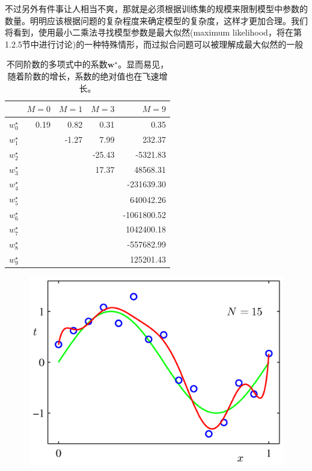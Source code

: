 \documentclass[b5paper]{book}
\numberwithin{equation}{chapter}
\begin{document}
{	\indent 不过另外有件事让人相当不爽，那就是必须根据训练集的规模来限制模型中参数的数量。明明应该根据问题的复杂程度来确定模型的复杂度，这样才更加合理。我们将看到，使用最小二乘法寻找模型参数是最大似然(maximum likelihood，将在第1.2.5节中进行讨论)的一种特殊情形，而过拟合问题可以被理解成最大似然的一般
	\begin{table}
		\centering
		\begin{tabular}{c|rrrr}
			\ & $M=0$ & $M=1$ & $M=3$ & $M=9$ \\
			\hline
			$w_0^\star$ & 0.19 & 0.82 & 0.31 & 0.35\\
			$w_1^\star$ & \  & -1.27 & 7.99 & 232.37\\
			$w_2^\star$ & \  & \  & -25.43 & -5321.83\\
			$w_3^\star$ & \  & \  & 17.37 & 48568.31\\
			$w_4^\star$ & \  & \  & \  & -231639.30\\
			$w_5^\star$ & \  & \  & \  & 640042.26\\
			$w_6^\star$ & \  & \  & \  & -1061800.52\\
			$w_7^\star$ & \  & \  & \  & 1042400.18\\
			$w_8^\star$ & \  & \  & \  & -557682.99\\
			$w_9^\star$ & \  & \  & \  & 125201.43\\
		\end{tabular}
		\caption{不同阶数的多项式中的系数$\mathbf{w^\star}$。显而易见，随着阶数的增长，系数的绝对值也在飞速增长。}
	\end{table}
	\begin{figure}[ht]
		\begin{minipage}[t]{0.5\linewidth}
		\includegraphics[scale=0.8]{Images/1-6a.png}

\end{minipage}
\end{figure}}
\end{document}
